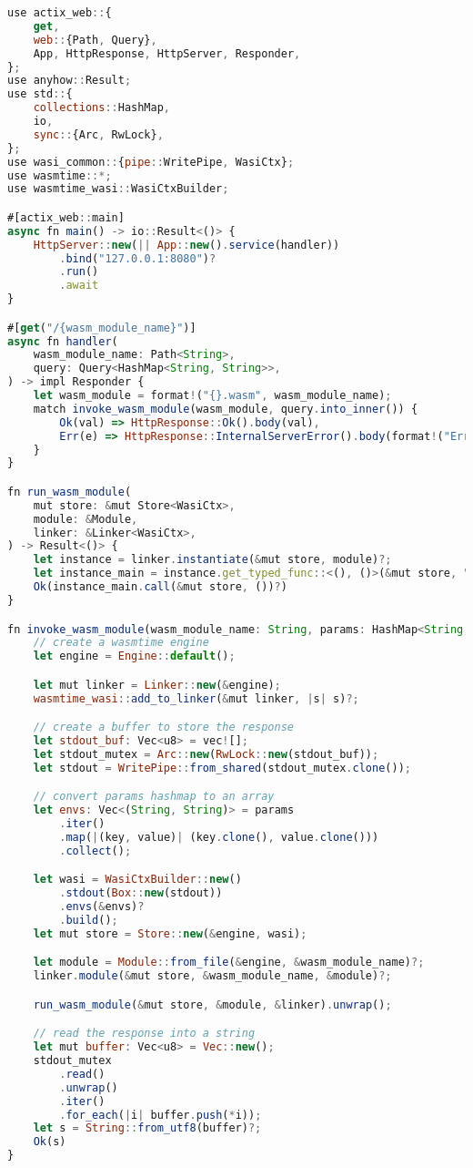 \begin{lstlisting}[frame=lines, caption=Simple Proof of Concept Wasm Serverless Platform using Actix and Wasmtime, captionpos=b, language=JavaScript, showstringspaces=false]
use actix_web::{
    get,
    web::{Path, Query},
    App, HttpResponse, HttpServer, Responder,
};
use anyhow::Result;
use std::{
    collections::HashMap,
    io,
    sync::{Arc, RwLock},
};
use wasi_common::{pipe::WritePipe, WasiCtx};
use wasmtime::*;
use wasmtime_wasi::WasiCtxBuilder;

#[actix_web::main]
async fn main() -> io::Result<()> {
    HttpServer::new(|| App::new().service(handler))
        .bind("127.0.0.1:8080")?
        .run()
        .await
}

#[get("/{wasm_module_name}")]
async fn handler(
    wasm_module_name: Path<String>,
    query: Query<HashMap<String, String>>,
) -> impl Responder {
    let wasm_module = format!("{}.wasm", wasm_module_name);
    match invoke_wasm_module(wasm_module, query.into_inner()) {
        Ok(val) => HttpResponse::Ok().body(val),
        Err(e) => HttpResponse::InternalServerError().body(format!("Error: {}", e)),
    }
}

fn run_wasm_module(
    mut store: &mut Store<WasiCtx>,
    module: &Module,
    linker: &Linker<WasiCtx>,
) -> Result<()> {
    let instance = linker.instantiate(&mut store, module)?;
    let instance_main = instance.get_typed_func::<(), ()>(&mut store, "_start")?;
    Ok(instance_main.call(&mut store, ())?)
}

fn invoke_wasm_module(wasm_module_name: String, params: HashMap<String, String>) -> Result<String> {
    // create a wasmtime engine
    let engine = Engine::default();

    let mut linker = Linker::new(&engine);
    wasmtime_wasi::add_to_linker(&mut linker, |s| s)?;

    // create a buffer to store the response
    let stdout_buf: Vec<u8> = vec![];
    let stdout_mutex = Arc::new(RwLock::new(stdout_buf));
    let stdout = WritePipe::from_shared(stdout_mutex.clone());

    // convert params hashmap to an array
    let envs: Vec<(String, String)> = params
        .iter()
        .map(|(key, value)| (key.clone(), value.clone()))
        .collect();

    let wasi = WasiCtxBuilder::new()
        .stdout(Box::new(stdout))
        .envs(&envs)?
        .build();
    let mut store = Store::new(&engine, wasi);

    let module = Module::from_file(&engine, &wasm_module_name)?;
    linker.module(&mut store, &wasm_module_name, &module)?;

    run_wasm_module(&mut store, &module, &linker).unwrap();

    // read the response into a string
    let mut buffer: Vec<u8> = Vec::new();
    stdout_mutex
        .read()
        .unwrap()
        .iter()
        .for_each(|i| buffer.push(*i));
    let s = String::from_utf8(buffer)?;
    Ok(s)
}
\end{lstlisting}